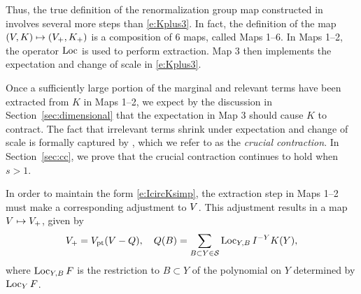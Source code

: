 Thus, the true definition of the renormalization group map constructed in
\cite{BS-rg-step} involves several more steps than \eqref{e:Kplus3}. In fact,
the definition of the map $(V, K) \mapsto (V_+, K_+)$ is a composition of
$6$ maps, called Maps 1--6. In Maps 1--2, the operator $\operatorname{Loc}$ is used to perform
extraction. Map 3 then implements the expectation and change of scale in
\eqref{e:Kplus3}.

Once a sufficiently large portion of the marginal and relevant terms have been
extracted from $K$ in Maps 1--2, we expect by the discussion in Section~\ref{sec:dimensional}
that the expectation in Map 3 should cause $K$ to contract. The fact that irrelevant
terms shrink under expectation and change of scale is formally captured by
\cite[Proposition~\ref{IE-prop:cl}]{BS-rg-IE}, which we refer to as the
\emph{crucial contraction}. In Section~\ref{sec:cc}, we prove that the
crucial contraction continues to hold when $s > 1$.

\begin{rk}
\label{rk:Vplus}
In order to maintain the form \eqref{e:IcircKsimp}, the extraction step in Maps 1--2
must make a corresponding adjustment to $V$.
This adjustment results in a map $V \mapsto V_+$, given by
\begin{equation}
V_+ = V_{\rm pt}(V - Q),
	\quad
Q(B) = \sum_{B \subset Y \in \mathcal{S}} \operatorname{Loc}_{Y,B} I^{-Y} K(Y),
\end{equation}
where $\operatorname{Loc}_{Y,B} F$ is the restriction to $B \subset Y$ of the polynomial on
$Y$ determined by $\operatorname{Loc}_Y F$.


\end{rk}


